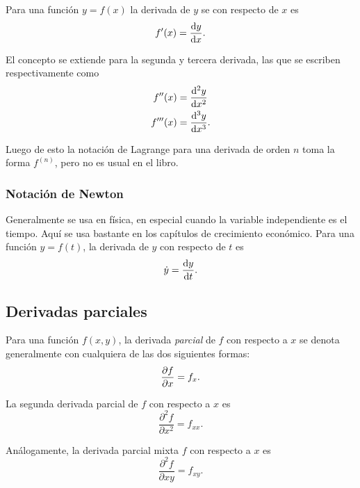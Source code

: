 \documentclass[DeGregorioResumen]{subfiles}
\begin{document}
Para una función $y=f(x)$ la derivada de  $y$ se con respecto de $x$ es
\[
f'(x) = \frac{\mathrm{d}y}{\mathrm{d}x}.
\]

El concepto se extiende para la segunda y tercera derivada, las que se escriben respectivamente como
\begin{align*}
f''(x) &= \frac{\mathrm{d}^2y}{\mathrm{d}x^2} \\ 
f'''(x) &= \frac{\mathrm{d}^3y}{\mathrm{d}x^3}.
\end{align*}

Luego de esto la notación de Lagrange para una derivada de orden $n$ toma la forma $f^{(n)}$, pero no es usual en el libro.

\subsubsection*{Notación de Newton}
Generalmente se usa en física, en especial cuando la variable independiente es el tiempo. Aquí se usa bastante en los capítulos de crecimiento económico. Para una función $y=f(t)$, la derivada de $y$ con respecto de $t$ es
\[
\dot y = \frac{\mathrm{d}y}{\mathrm{d}t}.
\]

\subsection*{Derivadas parciales}

Para una función $f(x,y)$, la derivada \emph{parcial} de $f$ con respecto a $x$ se denota generalmente con cualquiera de las dos siguientes formas:
\[
\frac{\partial f}{\partial x} = f_x.
\]

La segunda derivada parcial de $f$ con respecto a $x$ es
\[
\frac{\partial^2f}{\partial x^2} = f_{xx}.
\]

Análogamente, la derivada parcial mixta $f$ con respecto a $x$ es
\[
\frac{\partial^2f}{\partial xy} = f_{xy}.
\]
 
\end{document}
